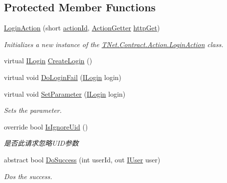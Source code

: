 \subsection*{Protected Member Functions}
\begin{DoxyCompactItemize}
\item 
\mbox{\hyperlink{class_t_net_1_1_contract_1_1_action_1_1_login_action_a74b64e33c1265a2ab57ca5f05b05ed9a}{Login\+Action}} (short \mbox{\hyperlink{class_t_net_1_1_service_1_1_game_struct_a8c3c761a891a0da9d72d17d34a0f7446}{action\+Id}}, \mbox{\hyperlink{class_t_net_1_1_service_1_1_action_getter}{Action\+Getter}} \mbox{\hyperlink{class_t_net_1_1_service_1_1_base_struct_a04c1171f14d9ee44612f9966a8d61d30}{http\+Get}})
\begin{DoxyCompactList}\small\item\em Initializes a new instance of the \mbox{\hyperlink{class_t_net_1_1_contract_1_1_action_1_1_login_action}{T\+Net.\+Contract.\+Action.\+Login\+Action}} class. \end{DoxyCompactList}\item 
virtual \mbox{\hyperlink{interface_t_net_1_1_sns_1_1_i_login}{I\+Login}} \mbox{\hyperlink{class_t_net_1_1_contract_1_1_action_1_1_login_action_ad7b35a9e1ee115580305c4f254f7a65c}{Create\+Login}} ()
\item 
virtual void \mbox{\hyperlink{class_t_net_1_1_contract_1_1_action_1_1_login_action_ad4750b6afd91d543a6e9236c15c6ab54}{Do\+Login\+Fail}} (\mbox{\hyperlink{interface_t_net_1_1_sns_1_1_i_login}{I\+Login}} login)
\item 
virtual void \mbox{\hyperlink{class_t_net_1_1_contract_1_1_action_1_1_login_action_afae30f8780ef8786430723a9f99e3612}{Set\+Parameter}} (\mbox{\hyperlink{interface_t_net_1_1_sns_1_1_i_login}{I\+Login}} login)
\begin{DoxyCompactList}\small\item\em Sets the parameter. \end{DoxyCompactList}\item 
override bool \mbox{\hyperlink{class_t_net_1_1_contract_1_1_action_1_1_login_action_ad0ee65777c20af8acea8da0f24c977cf}{Is\+Ignore\+Uid}} ()
\begin{DoxyCompactList}\small\item\em 是否此请求忽略\+U\+I\+D参数 \end{DoxyCompactList}\item 
abstract bool \mbox{\hyperlink{class_t_net_1_1_contract_1_1_action_1_1_login_action_a37c617c336f549bff501efa11163474e}{Do\+Success}} (int user\+Id, out \mbox{\hyperlink{interface_t_net_1_1_context___1_1_i_user}{I\+User}} user)
\begin{DoxyCompactList}\small\item\em Dos the success. \end{DoxyCompactList}\end{DoxyCompactItemize}
